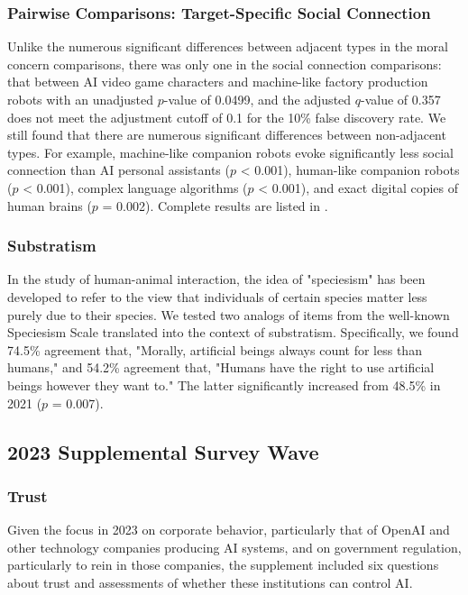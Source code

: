 \documentclass[manuscript,screen,review,nonacm]{acmart}
\begin{document}
\subsubsection{Pairwise Comparisons: Target-Specific Social Connection}

Unlike the numerous significant differences between adjacent types in the moral concern comparisons, there was only one in the social connection comparisons: that between AI video game characters and machine-like factory production robots with an unadjusted $p$-value of 0.0499, and the adjusted $q$-value of 0.357 does not meet the adjustment cutoff of 0.1 for the 10\% false discovery rate. We still found that there are numerous significant differences between non-adjacent types. For example, machine-like companion robots evoke significantly less social connection than AI personal assistants ($p$ < 0.001), human-like companion robots ($p$ < 0.001), complex language algorithms ($p$ < 0.001), and exact digital copies of human brains ($p$ = 0.002). Complete results are listed in .

\subsubsection{Substratism}

In the study of human-animal interaction, the idea of "speciesism" has been developed to refer to the view that individuals of certain species matter less purely due to their species. We tested two analogs of items from the well-known Speciesism Scale \cite{caviola18} translated into the context of substratism. Specifically, we found 74.5\% agreement that, "Morally, artificial beings always count for less than humans," and 54.2\% agreement that, "Humans have the right to use artificial beings however they want to." The latter significantly increased from 48.5\% in 2021 ($p$ = 0.007).

\subsection{2023 Supplemental Survey Wave}

\subsubsection{Trust}

Given the focus in 2023 on corporate behavior, particularly that of OpenAI and other technology companies producing AI systems, and on government regulation, particularly to rein in those companies, the supplement included six questions about trust and assessments of whether these institutions can control AI.
\end{document}
